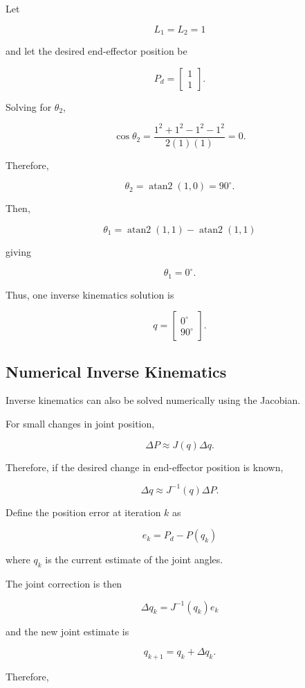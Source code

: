 \documentclass{article}
\begin{document}
Let

\[
L_1=L_2=1
\]

and let the desired end-effector position be

\[
P_d=
\begin{bmatrix}
1\\
1
\end{bmatrix}.
\]

Solving for $\theta_2$,

\[
\cos\theta_2
=
\frac{1^2+1^2-1^2-1^2}
{2(1)(1)}
=0.
\]

Therefore,

\[
\theta_2
=
\operatorname{atan2}(1,0)
=
90^\circ.
\]

Then,

\[
\theta_1
=
\operatorname{atan2}(1,1)
-
\operatorname{atan2}(1,1)
\]

giving

\[
\theta_1=0^\circ.
\]

Thus, one inverse kinematics solution is

\[
\boxed{
q=
\begin{bmatrix}
0^\circ\\
90^\circ
\end{bmatrix}.
}
\]


\subsection{Numerical Inverse Kinematics}

Inverse kinematics can also be solved numerically using the Jacobian.

For small changes in joint position,

\[
\Delta P
\approx
J(q)\Delta q.
\]

Therefore, if the desired change in end-effector position is known,

\[
\Delta q
\approx
J^{-1}(q)\Delta P.
\]

Define the position error at iteration $k$ as

\[
\boxed{
e_k=P_d-P(q_k)
}
\]

where $q_k$ is the current estimate of the joint angles.

The joint correction is then

\[
\boxed{
\Delta q_k
=
J^{-1}(q_k)e_k
}
\]

and the new joint estimate is

\[
\boxed{
q_{k+1}
=
q_k+\Delta q_k.
}
\]

Therefore,
\end{document}
